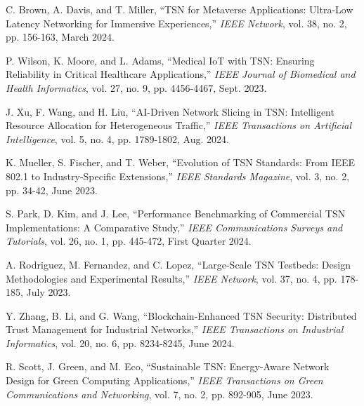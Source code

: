\documentclass[10pt, journal, compsoc]{IEEEtran}
\begin{document}
\begin{thebibliography}{99}
C. Brown, A. Davis, and T. Miller, ``TSN for Metaverse Applications: Ultra-Low Latency Networking for Immersive Experiences,'' \textit{IEEE Network}, vol. 38, no. 2, pp. 156-163, March 2024.

P. Wilson, K. Moore, and L. Adams, ``Medical IoT with TSN: Ensuring Reliability in Critical Healthcare Applications,'' \textit{IEEE Journal of Biomedical and Health Informatics}, vol. 27, no. 9, pp. 4456-4467, Sept. 2023.

J. Xu, F. Wang, and H. Liu, ``AI-Driven Network Slicing in TSN: Intelligent Resource Allocation for Heterogeneous Traffic,'' \textit{IEEE Transactions on Artificial Intelligence}, vol. 5, no. 4, pp. 1789-1802, Aug. 2024.

K. Mueller, S. Fischer, and T. Weber, ``Evolution of TSN Standards: From IEEE 802.1 to Industry-Specific Extensions,'' \textit{IEEE Standards Magazine}, vol. 3, no. 2, pp. 34-42, June 2023.

S. Park, D. Kim, and J. Lee, ``Performance Benchmarking of Commercial TSN Implementations: A Comparative Study,'' \textit{IEEE Communications Surveys and Tutorials}, vol. 26, no. 1, pp. 445-472, First Quarter 2024.

A. Rodriguez, M. Fernandez, and C. Lopez, ``Large-Scale TSN Testbeds: Design Methodologies and Experimental Results,'' \textit{IEEE Network}, vol. 37, no. 4, pp. 178-185, July 2023.

Y. Zhang, B. Li, and G. Wang, ``Blockchain-Enhanced TSN Security: Distributed Trust Management for Industrial Networks,'' \textit{IEEE Transactions on Industrial Informatics}, vol. 20, no. 6, pp. 8234-8245, June 2024.

R. Scott, J. Green, and M. Eco, ``Sustainable TSN: Energy-Aware Network Design for Green Computing Applications,'' \textit{IEEE Transactions on Green Communications and Networking}, vol. 7, no. 2, pp. 892-905, June 2023.

\end{thebibliography}
\end{document}
